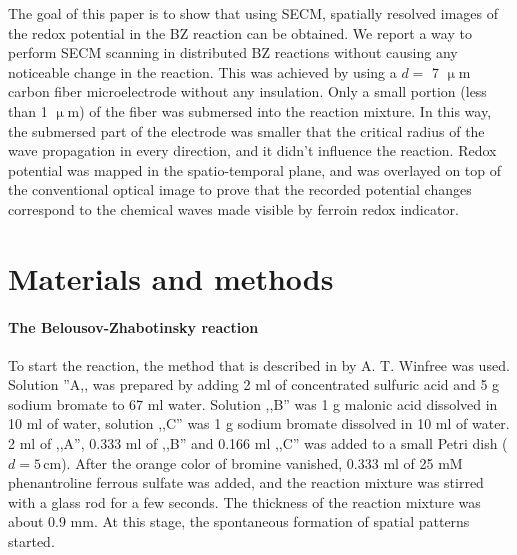 \documentclass[3p, twocolumn]{elsarticle}
\begin{document}
The goal of this paper is to show that using SECM, spatially resolved images of the redox potential in the BZ reaction can be obtained.
We report a way to perform SECM scanning in distributed BZ reactions without causing any noticeable change in the reaction.
This was achieved by using a $d=$ 7 $\upmu$m carbon fiber microelectrode without any insulation.
Only a small portion (less than 1 $\upmu$m) of the fiber was submersed into the reaction mixture.
In this way, the submersed part of the electrode was smaller that the critical radius of the wave propagation \cite{foerster1989critical} in every direction, and it didn't influence the reaction.
Redox potential was mapped in the spatio-temporal plane, and was overlayed on top of the conventional optical image to prove that the recorded potential changes correspond to the chemical waves made visible by ferroin redox indicator.

\section{Materials and methods}
\paragraph{The Belousov-Zhabotinsky reaction} To start the reaction, the method that is described in \cite{winfree2001geometry} by A. T. Winfree was used.
Solution ''A,, was prepared by adding 2 ml of concentrated sulfuric acid and 5 g sodium bromate to 67 ml water.
Solution ,,B'' was 1 g malonic acid dissolved in 10 ml of water, solution ,,C'' was 1 g sodium bromate dissolved in 10 ml of water.
2 ml of ,,A'', 0.333 ml of ,,B'' and 0.166 ml ,,C'' was added to a small Petri dish ($d=5 \,$cm).
After the orange color of bromine vanished, 0.333 ml of 25 mM phenantroline ferrous sulfate was added, and the reaction mixture was stirred with a glass rod for a few seconds.
The thickness of the reaction mixture was about 0.9 mm.
At this stage, the spontaneous formation of spatial patterns started.
\end{document}
